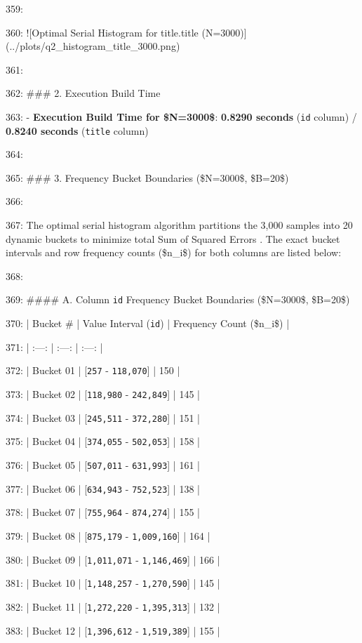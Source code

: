 \documentclass[11pt,a4paper]{article}
\begin{document}
359:

360: ![Optimal Serial Histogram for title.title (N=3000)](../plots/q2\_histogram\_title\_3000.png)

361:

362: \#\#\# 2. Execution Build Time

363: - \textbf{Execution Build Time for \$N=3000\$}: \textbf{0.8290 seconds} (\texttt{id} column) / \textbf{0.8240 seconds} (\texttt{title} column)

364:

365: \#\#\# 3. Frequency Bucket Boundaries (\$N=3000\$, \$B=20\$)

366:

367: The optimal serial histogram algorithm partitions the 3,000 samples into 20 dynamic buckets to minimize total Sum of Squared Errors . The exact bucket intervals and row frequency counts (\$n\_i\$) for both columns are listed below:

368:

369: \#\#\#\# A. Column \texttt{id} Frequency Bucket Boundaries (\$N=3000\$, \$B=20\$)

370: | Bucket \# | Value Interval (\texttt{id}) | Frequency Count (\$n\_i\$) |

371: | :---: | :---: | :---: |

372: | Bucket 01 | [\texttt{257} - \texttt{118,070}] | 150 |

373: | Bucket 02 | [\texttt{118,980} - \texttt{242,849}] | 145 |

374: | Bucket 03 | [\texttt{245,511} - \texttt{372,280}] | 151 |

375: | Bucket 04 | [\texttt{374,055} - \texttt{502,053}] | 158 |

376: | Bucket 05 | [\texttt{507,011} - \texttt{631,993}] | 161 |

377: | Bucket 06 | [\texttt{634,943} - \texttt{752,523}] | 138 |

378: | Bucket 07 | [\texttt{755,964} - \texttt{874,274}] | 155 |

379: | Bucket 08 | [\texttt{875,179} - \texttt{1,009,160}] | 164 |

380: | Bucket 09 | [\texttt{1,011,071} - \texttt{1,146,469}] | 166 |

381: | Bucket 10 | [\texttt{1,148,257} - \texttt{1,270,590}] | 145 |

382: | Bucket 11 | [\texttt{1,272,220} - \texttt{1,395,313}] | 132 |

383: | Bucket 12 | [\texttt{1,396,612} - \texttt{1,519,389}] | 155 |
\end{document}
